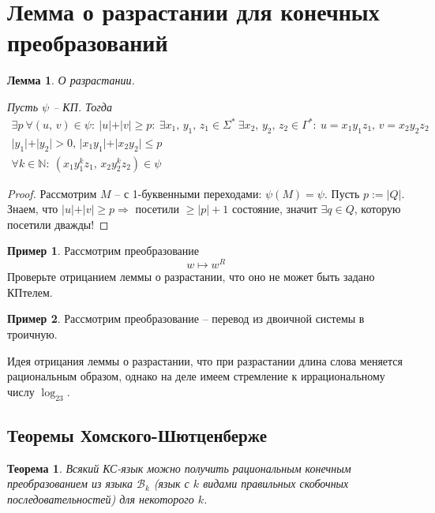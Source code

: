 \documentclass[a4paper,12pt]{article}
\renewcommand{\leq}{\ensuremath{\leqslant}}
\renewcommand{\geq}{\ensuremath{\geqslant}}
\theoremstyle{plain}
\newtheorem{theorem}{Теорема}[subsection]
\newtheorem{lemma}{Лемма}[subsection]
\theoremstyle{definition}
\newtheorem*{example}{Пример}
\theoremstyle{remark}
\begin{document}
\section{Лемма о разрастании для конечных преобразований}
\begin{lemma}
	О разрастании.

	Пусть $\psi$ -- КП. Тогда
	\begin{align*}
		\exists p \: \forall (u,\,v) \in \psi :\: \vert u\vert + \vert v\vert \geq p :\: \exists x_1,\,y_1,\,z_1 \in \Sigma^* \: \exists x_2,\,y_2,\,z_2 \in \Gamma^* :\: u = x_1y_1z_1,\, v = x_2y_2z_2 \\
		\vert y_1\vert + \vert y_2\vert > 0,\, \vert x_1y_1\vert+\vert x_2y_2\vert \leq p                                                                                                                \\
		\forall k \in \mathbb{N} :\: (x_1y_1^kz_1,\, x_2y_2^kz_2) \in \psi
	\end{align*}
\end{lemma}

\begin{proof}
	Рассмотрим $M$ -- с 1-буквенными переходами: $\psi(M) = \psi$. Пусть $p := \vert Q\vert$. Знаем, что $\vert u\vert+\vert v\vert \geq p \Rightarrow$ посетили $\geq \vert p\vert+1$ состояние, значит $\exists q \in Q$, которую посетили дважды!
\end{proof}

\begin{example}
	Рассмотрим преобразование
	\[
		w \mapsto w^R
	\]
	Проверьте отрицанием леммы о разрастании, что оно не может быть задано КПтелем.
\end{example}

\begin{example}
	Рассмотрим преобразование -- перевод из двоичной системы в троичную.

	Идея отрицания леммы о разрастании, что при разрастании длина слова меняется рациональным образом, однако на деле имеем стремление к иррациональному числу $\log_23$.
\end{example}

\subsection{Теоремы Хомского-Шютценберже}
\begin{theorem}
	Всякий КС-язык можно получить рациональным конечным преобразованием из языка $\mathcal{B}_k$ (язык с $k$ видами правильных скобочных последовательностей) для некоторого $k$.
\end{theorem}
\end{document}
